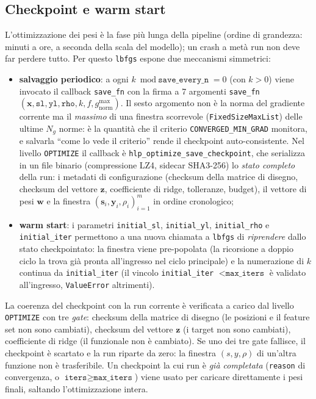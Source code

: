 \subsection{Checkpoint e warm start}
\label{sec:lbfgs-checkpoint}

L'ottimizzazione dei pesi è la fase più lunga della pipeline (ordine di
grandezza: minuti a ore, a seconda della scala del modello); un crash a
metà run non deve far perdere tutto. Per questo \texttt{lbfgs} espone due
meccanismi simmetrici:

\begin{itemize}
\item \textbf{salvaggio periodico}: a ogni
  $k \bmod \texttt{save\_every\_n} = 0$ (con $k > 0$) viene invocato il
  callback \texttt{save\_fn} con la firma a 7 argomenti
  \texttt{save\_fn}$(\bm{x}, \texttt{sl}, \texttt{yl}, \texttt{rho}, k, f,
  g_{\mathrm{norm}}^{\max})$. Il sesto argomento non è la norma del
  gradiente corrente ma il \emph{massimo} di una finestra scorrevole
  (\texttt{FixedSizeMaxList}) delle ultime $N_g$ norme: è la quantità
  che il criterio \texttt{CONVERGED\_MIN\_GRAD} monitora, e salvarla
  ``come lo vede il criterio'' rende il checkpoint auto-consistente.
  Nel livello \texttt{OPTIMIZE} il callback è
  \texttt{hlp\_optimize\_save\_checkpoint}, che serializza in un file
  binario (compressione LZ4, sidecar SHA3-256) lo \emph{stato completo}
  della run: i metadati di configurazione (checksum della matrice di
  disegno, checksum del vettore $\bm{z}$, coefficiente di ridge,
  tolleranze, budget), il vettore di pesi $\bm{w}$ e la finestra
  $(\bm{s}_i, \bm{y}_i, \rho_i)_{i=1}^{m}$ in ordine cronologico;
\item \textbf{warm start}: i parametri \texttt{initial\_sl},
  \texttt{initial\_yl}, \texttt{initial\_rho} e \texttt{initial\_iter}
  permettono a una nuova chiamata a \texttt{lbfgs} di \emph{riprendere}
  dallo stato checkpointato: la finestra viene pre-popolata (la
  ricorsione a doppio ciclo la trova già pronta all'ingresso nel ciclo
  principale) e la numerazione di $k$ continua da \texttt{initial\_iter}
  (il vincolo \texttt{initial\_iter} $< \texttt{max\_iters}$ è validato
  all'ingresso, \texttt{ValueError} altrimenti).
\end{itemize}

La coerenza del checkpoint con la run corrente è verificata a carico dal
livello \texttt{OPTIMIZE} con tre \emph{gate}: checksum della matrice di
disegno (le posizioni e il feature set non sono cambiati), checksum del
vettore $\bm{z}$ (i target non sono cambiati), coefficiente di ridge
(il funzionale non è cambiato). Se uno dei tre gate fallisce, il
checkpoint è scartato e la run riparte da zero: la finestra $(s,y,\rho)$
di un'altra funzione non è trasferibile. Un checkpoint la cui run è
\emph{già completata} (\texttt{reason} di convergenza, o
$\texttt{iters} \ge \texttt{max\_iters}$) viene usato per caricare
direttamente i pesi finali, saltando l'ottimizzazione intera.

